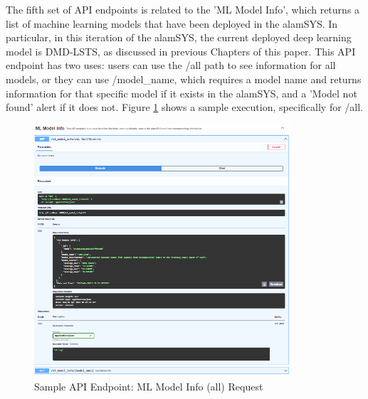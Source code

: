 The fifth set of API endpoints is related to the 'ML Model Info', 
which returns a list of machine learning models that have been deployed in 
the alamSYS. In particular, in this iteration of the alamSYS, the current 
deployed deep learning model is DMD-LSTS, as discussed in previous Chapters 
of this paper. This API endpoint has two uses: users can use the /all path 
to see information for all models, or they can use /model\_name, which requires 
a model name and returns information for that specific model if it exists in 
the alamSYS, and a 'Model not found' alert if it does not. Figure 
\ref{fig:alamAPI_ml} shows a sample execution, specifically for /all.
\begin{figure}[ht]
    \centering
    \includegraphics[width=0.85\textwidth]{./assets/Chapter_4/Documentation/alamAPI_ml.png}
    \caption{Sample API Endpoint: ML Model Info (all) Request}
    \label{fig:alamAPI_ml}
\end{figure}
\FloatBarrier


